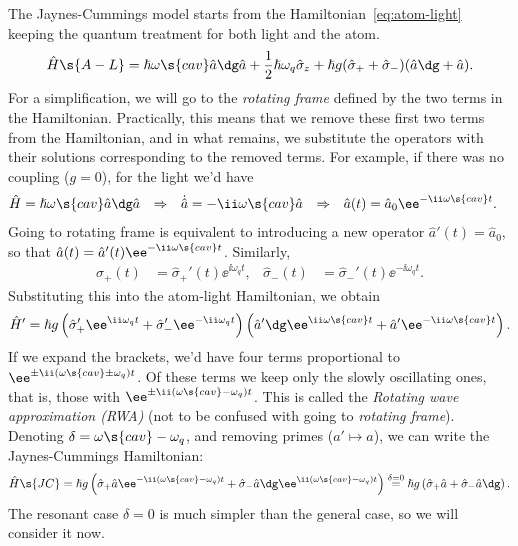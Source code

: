 \documentclass[fontsize=9pt,bookmarkpackage=false]{scrartcl}
\renewcommand{\hbar}{\hslash}
\begin{document}
The Jaynes-Cummings model starts from the Hamiltonian~\cref{eq:atom-light} keeping the quantum treatment for both light and the atom.
\begin{equation}
  \hat H\s{A-L} = \hbar \omega\s{cav} \hat a\dg \hat a
  + \frac 12 \hbar \omega_q \hat \sigma_z
  + \hbar g ( \hat \sigma_+ + \hat \sigma_- ) ( \hat a \dg + \hat a ).
\end{equation}
For a simplification, we will go to the \emph{rotating frame} defined by the two terms in the Hamiltonian.
Practically, this means that we remove these first two terms from the Hamiltonian, and in what remains, we substitute the operators with their solutions corresponding to the removed terms.
For example, if there was no coupling ($g = 0$), for the light we'd have
\begin{align}
  \hat H & = \hbar \omega\s{cav} \hat a \dg \hat a
  & \Rightarrow &&
  \dot{ \hat a } & = - \ii \omega\s{cav} \hat a
  & \Rightarrow &&
  \hat a (t) & = \hat a_0 \ee^ { - \ii \omega\s{cav} t }.
\end{align}
Going to rotating frame is equivalent to introducing a new operator  $\hat a'(t) = \hat a_0$, so that $\hat a (t) = \hat a'(t) \ee^{ - \ii \omega\s{cav} t }$.
Similarly,
\begin{align}
  \hat \sigma_+ (t) & = \hat \sigma_+' (t) \ee^{ \ii \omega_q t },
  &
  \hat \sigma_- (t) & = \hat \sigma_-' (t) \ee^{ - \ii \omega_q t }.
\end{align}
Substituting this into the atom-light Hamiltonian, we obtain
\begin{equation}
  \hat H' = \hbar g
  \left( \hat \sigma_+' \ee^{ \ii \omega_ q t } + \hat \sigma_-' \ee^{ - \ii \omega_q t } \right)
  \left( \hat a'{} \dg \ee^{ \ii \omega\s{cav} t } + \hat a' \ee^{ - \ii \omega\s{cav} t }  \right).
\end{equation}
If we expand the brackets, we'd have four terms proportional to $\ee^{ \pm \ii ( \omega\s{cav} \pm \omega_q ) t }$.
Of these terms we keep only the slowly oscillating ones, that is, those with $\ee^{ \pm \ii (\omega\s{cav} - \omega_q ) t }$.
This is called the \emph{Rotating wave approximation (RWA)} (not to be confused with going to \emph{rotating frame}).
Denoting $\delta = \omega\s{cav} - \omega_q$, and removing primes ($a' \mapsto a$), we can write the Jaynes-Cummings Hamiltonian:
\begin{equation}
  \hat H\s{JC} = \hbar g
  \left(
  \hat \sigma_+ \hat a \ee^{ - \ii ( \omega\s{cav} - \omega_q ) t }
  +
  \hat \sigma_- \hat a\dg \ee^{ \ii ( \omega\s{cav} - \omega_q ) t }
  \right)
  \stackrel{ \delta = 0 }{=}
  \hbar g \left( \hat \sigma_+ \hat a + \hat \sigma_- \hat a\dg \right).
\end{equation}
The resonant case $\delta = 0$ is much simpler than the general case, so we will consider it now.
\end{document}
